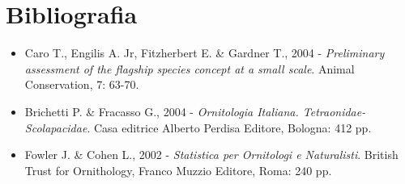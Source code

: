 \section{Bibliografia}

\begin{itemize}
\item Caro T., Engilis A. Jr, Fitzherbert E. \& Gardner T., 2004 - \emph{Preliminary assessment of the flagship species concept at a small scale}. Animal Conservation, 7: 63-70.
\item Brichetti P. \& Fracasso G., 2004 - \emph{Ornitologia Italiana. Tetraonidae-Scolapacidae}. Casa editrice Alberto Perdisa Editore, Bologna: 412 pp.
\item Fowler J. \& Cohen L., 2002 - \emph{Statistica per Ornitologi e Naturalisti}. British Trust for Ornithology, Franco Muzzio Editore, Roma: 240 pp. 

\end{itemize}